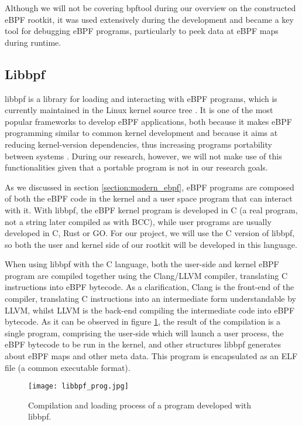 Although we will not be covering bpftool during our overview on the constructed eBPF rootkit, it was used extensively during the development and became a key tool for debugging eBPF programs, particularly to peek data at eBPF maps during runtime.

\subsection{Libbpf}
libbpf \cite{libbpf_github} is a library for loading and interacting with eBPF programs, which is currently maintained in the Linux kernel source tree \cite{libbpf_upstream}. It is one of the most popular frameworks to develop eBPF applications, both because it makes eBPF programming similar to common kernel development and because it aims at reducing kernel-version dependencies, thus increasing programs portability between systems \cite{libbpf_core}. During our research, however, we will not make use of this functionalities given that a portable program is not in our research goals.

As we discussed in section \ref{section:modern_ebpf}, eBPF programs are composed of both the eBPF code in the kernel and a user space program that can interact with it. With libbpf, the eBPF kernel program is developed in C (a real program, not a string later compiled as with BCC), while user programs are usually developed in C, Rust or GO. For our project, we will use the C version of libbpf, so both the user and kernel side of our rootkit will be developed in this language.

When using libbpf with the C language, both the user-side and kernel eBPF program are compiled together using the Clang/LLVM compiler, translating C instructions into eBPF bytecode. As a clarification, Clang is the front-end of the compiler, translating C instructions into an intermediate form understandable by LLVM, whilst LLVM is the back-end compiling the intermediate code into eBPF bytecode. As it can be observed in figure \ref{fig:libbpf}, the result of the compilation is a single program, comprising the user-side which will launch a user process, the eBPF bytecode to be run in the kernel, and other structures libbpf generates about eBPF maps and other meta data. This program is encapsulated as an ELF file (a common executable format).

\begin{figure}[htbp]
	\centering
	\texttt{[image: libbpf\_prog.jpg]}
	\caption{Compilation and loading process of a program developed with libbpf.}
	\label{fig:libbpf}
\end{figure}

